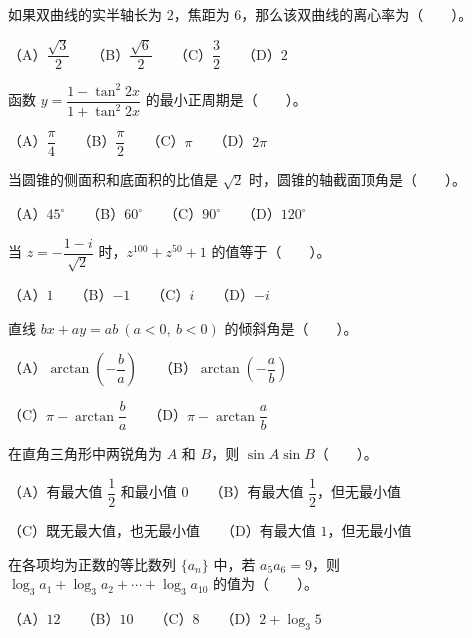 \begin{question}
如果双曲线的实半轴长为 $2$，焦距为 $6$，那么该双曲线的离心率为\mbox{（　　）}。

（A）$\dfrac{\sqrt3}{2}$　　（B）$\dfrac{\sqrt6}{2}$　　（C）$\dfrac32$　　（D）$2$

\end{question}
\begin{question}
函数 $y=\dfrac{1-\tan^2 2x}{1+\tan^2 2x}$ 的最小正周期是\mbox{（　　）}。

（A）$\dfrac\pi4$　　（B）$\dfrac\pi2$　　（C）$\pi$　　（D）$2\pi$

\end{question}
\begin{question}
当圆锥的侧面积和底面积的比值是 $\sqrt2$ 时，圆锥的轴截面顶角是\mbox{（　　）}。

（A）$45^\circ$　　（B）$60^\circ$　　（C）$90^\circ$　　（D）$120^\circ$

\end{question}
\begin{question}
当 $z=-\dfrac{1-i}{\sqrt2}$ 时，$z^{100}+z^{50}+1$ 的值等于\mbox{（　　）}。

（A）$1$　　（B）$-1$　　（C）$i$　　（D）$-i$

\end{question}
\begin{question}
直线 $bx+ay=ab\ (a<0,\ b<0)$ 的倾斜角是\mbox{（　　）}。

（A）$\arctan\left(-\dfrac ba\right)$　　（B）$\arctan\left(-\dfrac ab\right)$

（C）$\pi-\arctan\dfrac ba$　　（D）$\pi-\arctan\dfrac ab$

\end{question}
\begin{question}
在直角三角形中两锐角为 $A$ 和 $B$，则 $\sin A\sin B$\mbox{（　　）}。

（A）有最大值 $\dfrac12$ 和最小值 $0$　　（B）有最大值 $\dfrac12$，但无最小值

（C）既无最大值，也无最小值　　（D）有最大值 $1$，但无最小值

\end{question}
\begin{question}
在各项均为正数的等比数列 $\{a_n\}$ 中，若 $a_5a_6=9$，则 $\log_3a_1+\log_3a_2+\cdots+\log_3a_{10}$ 的值为\mbox{（　　）}。

（A）$12$　　（B）$10$　　（C）$8$　　（D）$2+\log_3 5$

\end{question}
